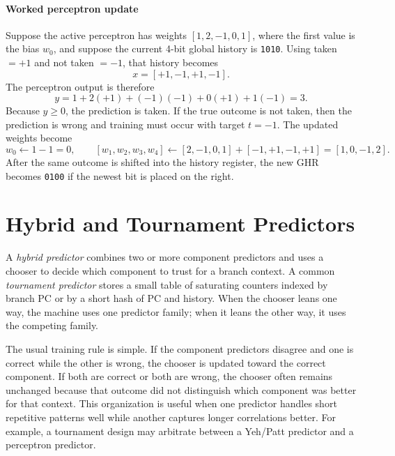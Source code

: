 \paragraph{Worked perceptron update}\label{par:auto-025k}
Suppose the active perceptron has weights $[1,2,-1,0,1]$, where the first value is the bias $w_0$, and suppose the current 4-bit global history is \texttt{1010}.
Using taken $=+1$ and not taken $=-1$, that history becomes
\[
    x=[+1,-1,+1,-1].
\]
The perceptron output is therefore
\begin{equation}\label{eq:pipe-perceptron-example}
    y=1+2(+1)+(-1)(-1)+0(+1)+1(-1)=3.
\end{equation}
Because $y\ge 0$, the prediction is taken.
If the true outcome is not taken, then the prediction is wrong and training must occur with target $t=-1$.
The updated weights become
\[
    w_0\leftarrow 1-1=0,\qquad
    [w_1,w_2,w_3,w_4]\leftarrow [2,-1,0,1]+[-1,+1,-1,+1]=[1,0,-1,2].
\]
After the same outcome is shifted into the history register, the new GHR becomes \texttt{0100} if the newest bit is placed on the right.


\section{Hybrid and Tournament Predictors}\label{sec:auto-043c}
A \textit{hybrid predictor} combines two or more component predictors and uses a chooser to decide which component to trust for a branch context.
A common \textit{tournament predictor} stores a small table of saturating counters indexed by branch PC or by a short hash of PC and history.
When the chooser leans one way, the machine uses one predictor family; when it leans the other way, it uses the competing family.

The usual training rule is simple.
If the component predictors disagree and one is correct while the other is wrong, the chooser is updated toward the correct component.
If both are correct or both are wrong, the chooser often remains unchanged because that outcome did not distinguish which component was better for that context.
This organization is useful when one predictor handles short repetitive patterns well while another captures longer correlations better.
For example, a tournament design may arbitrate between a Yeh/Patt predictor and a perceptron predictor.

